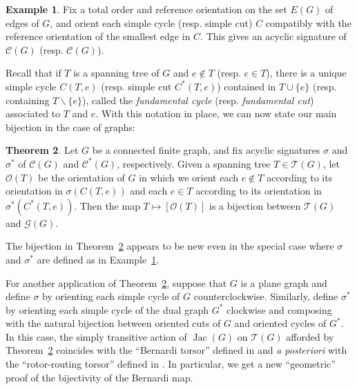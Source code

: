 \documentclass[12pt]{amsart}
\numberwithin{equation}{section}
\theoremstyle{definition}
\newtheorem{theorem}{Theorem}[subsection]
\newtheorem{example}[theorem]{Example}
\newcommand{\Jac}{\operatorname{Jac}}
\begin{document}
\begin{example} \label{ex:smallestedge}
Fix a total order and reference orientation on the set $E(G)$ of edges of $G$, and orient each simple cycle (resp. simple cut) $C$ compatibly with the reference orientation of the smallest edge in $C$.  This gives an acyclic signature of ${\mathcal C}(G)$ (resp. ${\mathcal C}(G)$).

\end{example}


Recall that if $T$ is a spanning tree of $G$ and $e \not\in T$ (resp. $e \in T$), there is a unique simple cycle  $C(T,e)$ (resp. simple cut $C^*(T,e)$) contained in $T \cup \{ e \}$ (resp. containing $T \backslash \{ e \}$), called the {\em fundamental cycle} (resp. {\em fundamental cut}) associated to $T$ and $e$. With this notation in place, we can now state our main bijection in the case of graphs:

\begin{theorem} \label{thm:mainbijectionforgraphs}
Let $G$ be a connected finite graph, and fix acyclic signatures $\sigma$ and $\sigma^*$ of ${\mathcal C}(G)$ and ${\mathcal C}^*(G)$, respectively. Given a spanning tree $T \in {\mathcal T}(G)$, let ${\mathcal O}(T)$ be the orientation of $G$ in which we orient each $e \not\in T$ according to its orientation in $\sigma(C(T,e))$ and each $e \in T$ according to its orientation in $\sigma^*(C^*(T,e))$. Then the map $T \mapsto [{\mathcal O}(T)]$ is a bijection between ${\mathcal T}(G)$ and ${\mathcal G}(G)$.
\end{theorem}

The bijection in Theorem~\ref{thm:mainbijectionforgraphs} appears to be new even in the special case where $\sigma$ and $\sigma^*$ are defined as in Example~\ref{ex:smallestedge}.

For another application of Theorem~\ref{thm:mainbijectionforgraphs}, suppose that $G$ is a plane graph and define $\sigma$ by orienting each simple cycle of $G$ counterclockwise.  Similarly, define $\sigma^*$ by orienting each simple cycle of the dual graph $G^*$ clockwise and composing with the natural bijection between oriented cuts of $G$ and oriented cycles of $G^*$.
In this case, the simply transitive action of $\Jac(G)$ on ${\mathcal T}(G)$ afforded by Theorem~\ref{thm:mainbijectionforgraphs} coincides with the ``Bernardi torsor'' defined in \cite{bakeryao2016torsor} and {\em a posteriori} with the ``rotor-routing torsor'' defined in \cite{chan2015rotor,chan2015duality}.  In particular, we get a new ``geometric'' proof of the bijectivity of the Bernardi map.
\end{document}
